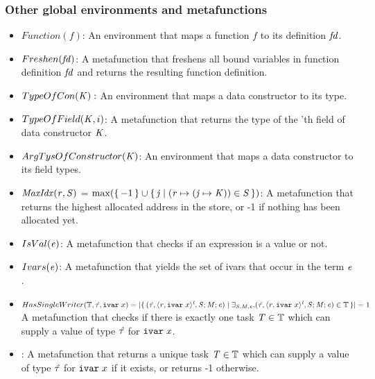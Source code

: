 \subsubsection{Other global environments and metafunctions}
\label{subsec:other-metafunctions}

\begin{itemize}
\item $Function(f)$: An environment that maps a function $f$ to its definition $\mathit{fd}$.

\item $Freshen(\mathit{fd})$: A metafunction that freshens all bound variables in function definition
$\mathit{fd}$ and returns the resulting function definition.

\item $TypeOfCon(\mathit{K}):$ An environment that maps a data constructor to its type.

\item $TypeOfField(\mathit{K},i)$: A metafunction that returns the type of the 'th field
of data constructor $\mathit{K}$.

\item $ArgTysOfConstructor(\mathit{K})$: An environment that maps a data constructor to its field types.

\item $\mathit{MaxIdx}(\mathit{r},\mathit{S})$ = $\max(\{ \, -1 \,\} \cup \{ \,  \mathit{j} \; | \; {(\mathit{r} \mapsto (\mathit{j} \mapsto \mathit{K})) \in \mathit{S}} \,\})$: A metafunction that returns the highest allocated address in the store,
or -1 if nothing has been allocated yet.

\item $IsVal(\mathit{e})$: A metafunction that checks if an expression is a value or not.

\item $Ivars(\mathit{e})$: A metafunction that yields the set of ivars that occur in the term $\mathit{e}$.

\item $ HasSingleWriter(\mathbb{T}, \mathit{\hat{\tau}}, \texttt{ivar}\; x) =
|\{ \, (\mathit{\hat{\tau}}, \langle \mathit{r}, \texttt{ivar}\; x \rangle ^{\mathit{l}}, \mathit{S};\mathit{M};\mathit{e}) \; | \; \exists_{\mathit{S},\mathit{M},\mathit{e}} . (\mathit{\hat{\tau}}, \langle \mathit{r}, \texttt{ivar}\; x \rangle ^{\mathit{l}}, \mathit{S};\mathit{M};\mathit{e}) \in \mathbb{T} \,\}| = 1
$ \\
%
A metafunction that checks if there is exactly one task $\mathit{T} \in \mathbb{T}$
which can supply a value of type $\mathit{\hat{\tau}}$ for $\texttt{ivar}\; x$.

\item \getwriter{\TASKSET}{\hTYP}{\indivar{\ivarid}}:
A metafunction that returns a unique task $\mathit{T} \in \mathbb{T}$
which can supply a value of type $\mathit{\hat{\tau}}$ for $\texttt{ivar}\; x$
if it exists, or returns -1 otherwise.


\end{itemize}
